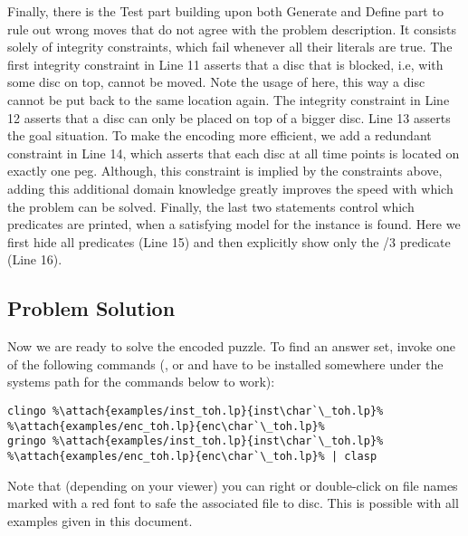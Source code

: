 Finally, there is the Test part building upon both Generate and Define part 
to rule out wrong moves that do not agree with the problem description.
It consists solely of integrity constraints, which fail whenever all their literals are true.
The first integrity constraint in Line 11 asserts 
that a disc that is blocked, i.e, with some disc on top, cannot be moved.
Note the usage of  here, this way a disc cannot be put back to the same location again.
The integrity constraint in Line 12 asserts that a disc can only be placed on top of a bigger disc.
Line 13 asserts the goal situation.
To make the encoding more efficient, we add a redundant constraint in Line 14,
which asserts that each disc at all time points is located on exactly one peg.
Although, this constraint is implied by the constraints above,
adding this additional domain knowledge greatly improves the speed with which the problem can be solved.
Finally, the last two statements control which predicates are printed, when a satisfying model
for the instance is found.
Here we first hide all predicates (Line 15) and then explicitly show only the /$3$ predicate (Line 16).

\subsection{Problem Solution}

Now we are ready to solve the encoded puzzle. 
To find an answer set, invoke one of the following commands 
(\clingo{}, or \gringo{} and \clasp{} have to be installed somewhere under the systems path for the commands below to work):
\begin{lstlisting}[numbers=none,escapechar=\%]
clingo %\attach{examples/inst_toh.lp}{inst\char`\_toh.lp}% %\attach{examples/enc_toh.lp}{enc\char`\_toh.lp}%
gringo %\attach{examples/inst_toh.lp}{inst\char`\_toh.lp}% %\attach{examples/enc_toh.lp}{enc\char`\_toh.lp}% | clasp
\end{lstlisting}
Note that (depending on your viewer) you can right or double-click on file names marked with a red font 
to safe the associated file to disc.
This is possible with all examples given in this document.


